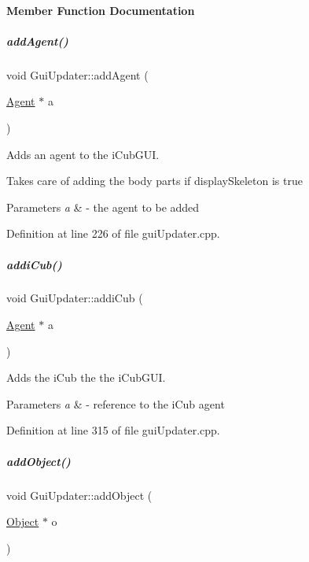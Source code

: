 \paragraph{Member Function Documentation}
\mbox{\label{group__guiUpdater_a1f2afbe4efaec509ee1687f35e7c0eef}} 
\subparagraph{\texorpdfstring{add\+Agent()}{addAgent()}}
{\footnotesize\ttfamily void Gui\+Updater\+::add\+Agent (\begin{DoxyParamCaption}\item[{\hyperlink{group__icubclient__representations_classicubclient_1_1Agent}{Agent} $\ast$}]{a }\end{DoxyParamCaption})}



Adds an agent to the i\+Cub\+G\+UI. 

Takes care of adding the body parts if {\ttfamily display\+Skeleton} is true 
\begin{DoxyParams}{Parameters}
{\em a} & -\/ the agent to be added \\
\hline
\end{DoxyParams}


Definition at line 226 of file gui\+Updater.\+cpp.

\mbox{\label{group__guiUpdater_ad83935ac90d7f0a3faf59baa3dd7658d}} 
\subparagraph{\texorpdfstring{addi\+Cub()}{addiCub()}}
{\footnotesize\ttfamily void Gui\+Updater\+::addi\+Cub (\begin{DoxyParamCaption}\item[{\hyperlink{group__icubclient__representations_classicubclient_1_1Agent}{Agent} $\ast$}]{a }\end{DoxyParamCaption})}



Adds the i\+Cub the the i\+Cub\+G\+UI. 


\begin{DoxyParams}{Parameters}
{\em a} & -\/ reference to the i\+Cub agent \\
\hline
\end{DoxyParams}


Definition at line 315 of file gui\+Updater.\+cpp.

\mbox{\label{group__guiUpdater_afa069ae03069ad5862a3beba9ef8c2fc}} 
\subparagraph{\texorpdfstring{add\+Object()}{addObject()}}
{\footnotesize\ttfamily void Gui\+Updater\+::add\+Object (\begin{DoxyParamCaption}\item[{\hyperlink{group__icubclient__representations_classicubclient_1_1Object}{Object} $\ast$}]{o }\end{DoxyParamCaption})}



